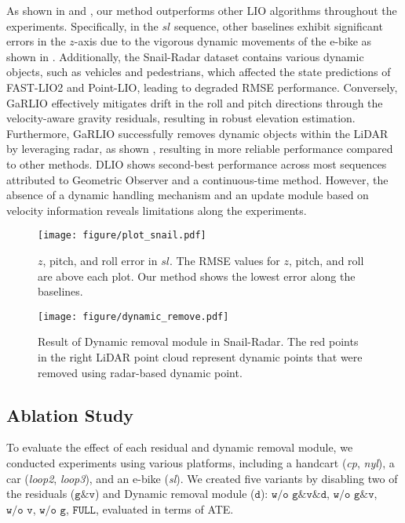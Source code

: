 As shown in  and , our method outperforms other LIO algorithms throughout the experiments. 
Specifically, in the $\textit{sl}$ sequence, other baselines exhibit significant errors in the $z$-axis due to the vigorous dynamic movements of the e-bike as shown in . Additionally, the Snail-Radar dataset contains various dynamic objects, such as vehicles and pedestrians, which affected the state predictions of FAST-LIO2 and Point-LIO, leading to degraded RMSE performance.
Conversely, GaRLIO effectively mitigates drift in the roll and pitch directions through the velocity-aware gravity residuals, resulting in robust elevation estimation. Furthermore, GaRLIO successfully removes dynamic objects within the LiDAR by leveraging radar, as shown , resulting in more reliable performance compared to other methods.
DLIO shows second-best performance across most sequences attributed to Geometric Observer and a continuous-time method. However, the absence of a dynamic handling mechanism and an update module based on velocity information reveals limitations along the experiments.

\begin{figure}[!t]
    \centering
    \texttt{[image: figure/plot\_snail.pdf]} 
    \caption{$z$, pitch, and roll error in $\textit{sl}$. The RMSE values for $z$, pitch, and roll are above each plot. Our method shows the lowest error along the baselines.
 }
    \label{fig:sl_sequence}
    \vspace{-3mm}
\end{figure}
\begin{figure}[]
    \centering
    \texttt{[image: figure/dynamic\_remove.pdf]}
    \caption{Result of Dynamic removal module in Snail-Radar. The red points in the right LiDAR point cloud represent dynamic points that were removed using radar-based dynamic point.}
    \label{fig:dynamic}
    \vspace{-7mm}
\end{figure}


\subsection{Ablation Study}
\label{subsec:ablation}

To evaluate the effect of each residual and dynamic removal module, we conducted experiments using various platforms, including a handcart (\textit{cp}, \textit{nyl}), a car (\textit{loop2}, \textit{loop3}), and an e-bike (\textit{sl}). We created five variants by disabling two of the residuals ($\texttt{g\&v}$) and Dynamic removal module ($\texttt{d}$): $\texttt{w/o g\&v\&d}$, $\texttt{w/o g\&v}$, $\texttt{w/o v}$, $\texttt{w/o g}$, $\texttt{FULL}$, evaluated in terms of \ac{ATE}.

